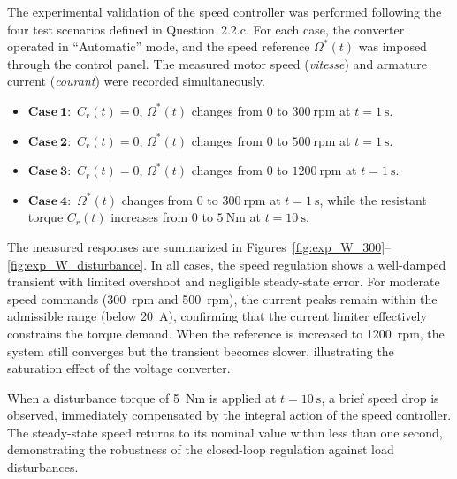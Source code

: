 \documentclass{rapportCS}
\begin{document}
The experimental validation of the speed controller was performed following the four test scenarios defined in Question~2.2.c. 
For each case, the converter operated in ``Automatic'' mode, and the speed reference $\Omega^*(t)$ was imposed through the control panel. 
The measured motor speed (\textit{vitesse}) and armature current (\textit{courant}) were recorded simultaneously.

\begin{itemize}
    \item $\mathbf{Case~1:}$ $C_r(t)=0$, $\Omega^*(t)$ changes from $0$ to $300~\text{rpm}$ at $t=1~\text{s}$.
    \item $\mathbf{Case~2:}$ $C_r(t)=0$, $\Omega^*(t)$ changes from $0$ to $500~\text{rpm}$ at $t=1~\text{s}$.
    \item $\mathbf{Case~3:}$ $C_r(t)=0$, $\Omega^*(t)$ changes from $0$ to $1200~\text{rpm}$ at $t=1~\text{s}$.
    \item $\mathbf{Case~4:}$ $\Omega^*(t)$ changes from $0$ to $300~\text{rpm}$ at $t=1~\text{s}$, while the resistant torque $C_r(t)$ increases from $0$ to $5~\text{Nm}$ at $t=10~\text{s}$.
\end{itemize}

The measured responses are summarized in Figures~\ref{fig:exp_W_300}--\ref{fig:exp_W_disturbance}. 
In all cases, the speed regulation shows a well-damped transient with limited overshoot and negligible steady-state error. 
For moderate speed commands (300~rpm and 500~rpm), the current peaks remain within the admissible range (below 20~A), confirming that the current limiter effectively constrains the torque demand. 
When the reference is increased to 1200~rpm, the system still converges but the transient becomes slower, illustrating the saturation effect of the voltage converter.

When a disturbance torque of 5~Nm is applied at $t=10~\text{s}$, a brief speed drop is observed, immediately compensated by the integral action of the speed controller. 
The steady-state speed returns to its nominal value within less than one second, demonstrating the robustness of the closed-loop regulation against load disturbances.
\end{document}
